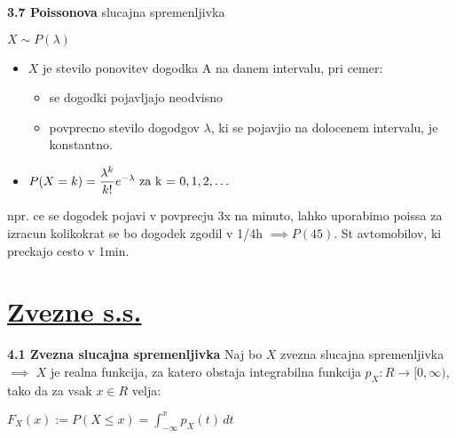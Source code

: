 \documentclass{article}
\begin{document}
\begin{multicols}{3}
\textbf{3.7 Poissonova} slucajna spremenljivka
\begin{center}
    \begin{math}
        X \sim P(\lambda)
    \end{math}
\end{center}
\begin{itemize}
    \item $X$ je stevilo ponovitev dogodka A na danem intervalu, pri cemer:
        \begin{itemize}
            \item se dogodki pojavljajo neodvisno
            \item povprecno stevilo dogodgov $\lambda$, ki se pojavjio na dolocenem intervalu, je konstantno.
        \end{itemize}
    \item \begin{math}
        P(X = k) =  \dfrac{ \lambda^{k} }{k!} e^{- \lambda}$ za k = $ 0,1,2,\dots
    \end{math}
\end{itemize}
npr. ce se dogodek pojavi v povprecju 3x na minuto, lahko uporabimo poissa za izracun
kolikokrat se bo dogodek zgodil v  1/4h $\implies P(45)$. St avtomobilov, ki preckajo cesto v 1min.

\section{\underline{Zvezne s.s.}}

\textbf{4.1 Zvezna slucajna spremenljivka}
Naj bo $X$ zvezna slucajna spremenljivka $\implies$ $X$ je realna funkcija,
za katero obstaja integrabilna funkcija $p_{X}: R \rightarrow [0, \infty)$,
tako da za vsak $x \in R$ velja:

\begin{center}
    \begin{math}
        F_{X}(x) := P(X \leq x) = \int_{- \infty}^{x} p_{X}(t) \,dt
    \end{math}
\end{center}


\end{multicols}
\end{document}
